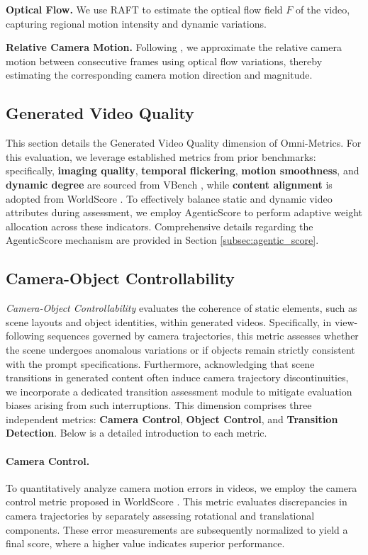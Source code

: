 \textbf{Optical Flow.} 
We use RAFT to estimate the optical flow field $F$ of the video, capturing regional motion intensity and dynamic variations.


\textbf{Relative Camera Motion.}
Following \cite{li2021generalizing}, we approximate the relative camera motion between consecutive frames using optical flow variations, thereby estimating the corresponding camera motion direction and magnitude.

\subsection{Generated Video Quality}

This section details the Generated Video Quality dimension of Omni-Metrics. For this evaluation, we leverage established metrics from prior benchmarks: specifically, \textbf{imaging quality}, \textbf{temporal flickering}, \textbf{motion smoothness}, and \textbf{dynamic degree} are sourced from VBench \cite{huang2024vbench}, while \textbf{content alignment} is adopted from WorldScore \cite{duan2025worldscore}. To effectively balance static and dynamic video attributes during assessment, we employ AgenticScore to perform adaptive weight allocation across these indicators. Comprehensive details regarding the AgenticScore mechanism are provided in Section \ref{subsec:agentic_score}.

\subsection{Camera-Object Controllability}
\textit{Camera-Object Controllability} evaluates the coherence of static elements, such as scene layouts and object identities, within generated videos. Specifically, in view-following sequences governed by camera trajectories, this metric assesses whether the scene undergoes anomalous variations or if objects remain strictly consistent with the prompt specifications. Furthermore, acknowledging that scene transitions in generated content often induce camera trajectory discontinuities, we incorporate a dedicated transition assessment module to mitigate evaluation biases arising from such interruptions.
This dimension comprises three independent metrics: \textbf{Camera Control}, \textbf{Object Control}, and \textbf{Transition Detection}. Below is a detailed introduction to each metric.

\paragraph{Camera Control.} To quantitatively analyze camera motion errors in videos, we employ the camera control metric proposed in WorldScore \cite{duan2025worldscore}. This metric evaluates discrepancies in camera trajectories by separately assessing rotational and translational components. These error measurements are subsequently normalized to yield a final score, where a higher value indicates superior performance.

